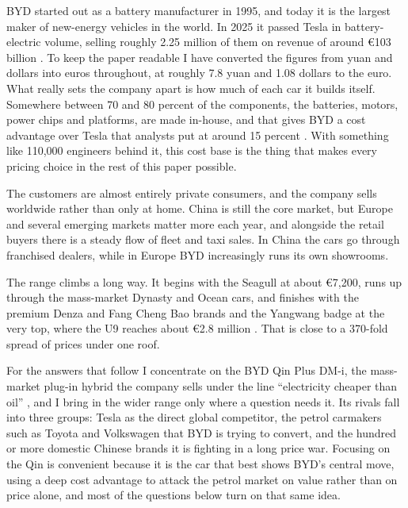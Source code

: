 
BYD started out as a battery manufacturer in 1995, and today it is the largest maker of new-energy vehicles in the world. In 2025 it passed Tesla in battery-electric volume, selling roughly 2.25 million of them on revenue of around \euro103 billion \cite{byd2025}. To keep the paper readable I have converted the figures from yuan and dollars into euros throughout, at roughly 7.8 yuan and 1.08 dollars to the euro. What really sets the company apart is how much of each car it builds itself. Somewhere between 70 and 80 percent of the components, the batteries, motors, power chips and platforms, are made in-house, and that gives BYD a cost advantage over Tesla that analysts put at around 15 percent \cite{motleyfool2025}. With something like 110{,}000 engineers behind it, this cost base is the thing that makes every pricing choice in the rest of this paper possible.

The customers are almost entirely private consumers, and the company sells worldwide rather than only at home. China is still the core market, but Europe and several emerging markets matter more each year, and alongside the retail buyers there is a steady flow of fleet and taxi sales. In China the cars go through franchised dealers, while in Europe BYD increasingly runs its own showrooms.

The range climbs a long way. It begins with the Seagull at about \euro7{,}200, runs up through the mass-market Dynasty and Ocean cars, and finishes with the premium Denza and Fang Cheng Bao brands and the Yangwang badge at the very top, where the U9 reaches about \euro2.8 million \cite{electrekU9}. That is close to a 370-fold spread of prices under one roof.

For the answers that follow I concentrate on the BYD Qin Plus DM-i, the mass-market plug-in hybrid the company sells under the line ``electricity cheaper than oil'' \cite{carscoopsQin}, and I bring in the wider range only where a question needs it. Its rivals fall into three groups: Tesla as the direct global competitor, the petrol carmakers such as Toyota and Volkswagen that BYD is trying to convert, and the hundred or more domestic Chinese brands it is fighting in a long price war. Focusing on the Qin is convenient because it is the car that best shows BYD's central move, using a deep cost advantage to attack the petrol market on value rather than on price alone, and most of the questions below turn on that same idea.
